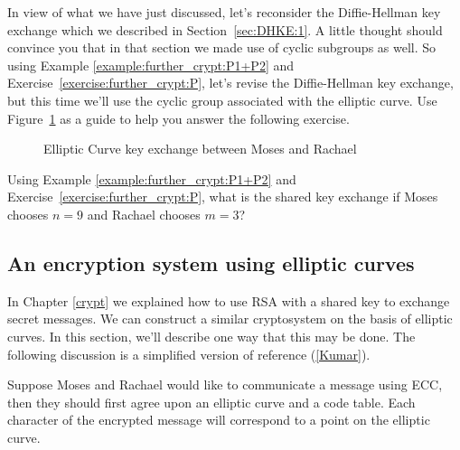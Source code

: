 In view of what we have just discussed, let's reconsider the Diffie-Hellman key exchange which we described in Section~\ref{sec:DHKE:1}. A little thought should convince you that in that section we made use of cyclic subgroups as well. So using Example \ref{example:further_crypt:P1+P2} and Exercise~\ref{exercise:further_crypt:P}, let's revise the Diffie-Hellman key exchange, but this time we'll use the cyclic group associated with the elliptic curve.  Use Figure~\ref{fig:DH:DHKE_8} as a guide to help you answer the following exercise.

\begin{figure}[htbp]
	  \caption{\label{fig:DH:DHKE_8} Elliptic Curve key exchange between Moses and Rachael }
\end{figure}

\begin{exer}
Using Example \ref{example:further_crypt:P1+P2} and Exercise~\ref{exercise:further_crypt:P}, what is the shared key exchange if Moses chooses $n = 9$ and Rachael chooses $m = 3$?
\end{exer}
\subsection{An encryption system using elliptic curves} 
In Chapter \ref{crypt} we explained how to use RSA with a shared key to exchange secret messages.  We can construct a similar cryptosystem on the basis of elliptic curves. In this section, we'll describe one way that this may be done. The following discussion is a simplified version of reference (\ref{Kumar}).

Suppose Moses and Rachael would like to communicate a message using ECC, then they should first agree upon an elliptic curve and a code table. Each character of the encrypted message will correspond to a point on the elliptic curve.

